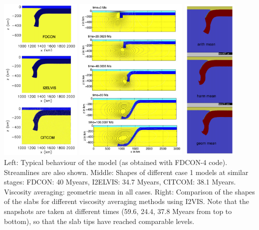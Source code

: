 \begin{center}
\includegraphics[height=8cm]{python_codes/fieldstone_67/images/scbe08b}
\includegraphics[height=8cm]{python_codes/fieldstone_67/images/scbe08c}
\includegraphics[height=8cm]{python_codes/fieldstone_67/images/scbe08d}\\
{\captionfont Left: Typical behaviour of the model (as obtained with FDCON-4 code). 
Streamlines are also shown.
Middle: Shapes of different case 1 models at similar stages: FDCON: 40 Myears,
I2ELVIS: 34.7 Myears, CITCOM: 38.1 Myears. Viscosity averaging: geometric mean
in all cases.
Right: Comparison of the shapes of the slabs for different viscosity averaging methods 
using I2VIS. Note that the snapshots are taken at different times (59.6, 24.4,
37.8 Myears from top to bottom), so that the slab tips have reached comparable
levels.}
\end{center}

